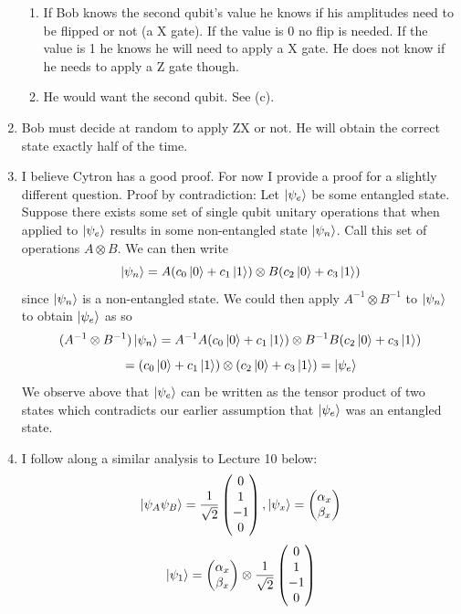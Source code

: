 \documentclass[12pt]{article}
\begin{document}
\begin{enumerate}[font=\bfseries]
\begin{enumerate}
        \item If Bob knows the second qubit's value he knows if his amplitudes need to be flipped or not (a X gate). If the value is 0 no flip is needed. If the value is 1 he knows he will need to apply a X gate. He does not know if he needs to apply a Z gate though.
        \item He would want the second qubit. See (c).
    \end{enumerate}
    \item Bob must decide at random to apply ZX or not. He will obtain the correct state exactly half of the time.
    \item I believe Cytron has a good proof. For now I provide a proof for a slightly different question. Proof by contradiction: Let $\ket{\psi_e}$ be some entangled state. Suppose there exists some set of single qubit unitary operations that when applied to $\ket{\psi_e}$ results in some non-entangled state $\ket{\psi_n}$. Call this set of operations $A \otimes B$. We can then write
    \[\ket{\psi_n} = A(c_0\ket{0}+c_1\ket{1}) \otimes B(c_2\ket{0}+c_3\ket{1})\]
    since $\ket{\psi_n}$ is a non-entangled state. We could then apply $A^{-1} \otimes B^{-1}$ to $\ket{\psi_n}$ to obtain $\ket{\psi_e}$ as so
    \[(A^{-1} \otimes B^{-1})\ket{\psi_n} = A^{-1}A(c_0\ket{0}+c_1\ket{1}) \otimes B^{-1}B(c_2\ket{0}+c_3\ket{1})\]
    \[= (c_0\ket{0}+c_1\ket{1}) \otimes (c_2\ket{0}+c_3\ket{1}) = \ket{\psi_e}\]
    We observe above that $\ket{\psi_e}$ can be written as the tensor product of two states which contradicts our earlier assumption that $\ket{\psi_e}$ was an entangled state.
    \item I follow along a similar analysis to Lecture 10 below:
    \[\ket{\psi_A\psi_B} = 
    \frac{1}{\sqrt{2}}
    \begin{pmatrix}
    0 \\ 1 \\ -1 \\ 0
    \end{pmatrix}
    ,
    \ket{\psi_x} = 
    \begin{pmatrix}
    \alpha_x \\ \beta_x
    \end{pmatrix}
    \]
    \[
    \ket{\psi_1} = \begin{pmatrix}
    \alpha_x \\ \beta_x
    \end{pmatrix}
    \otimes
    \frac{1}{\sqrt{2}}
    \begin{pmatrix}
    0 \\ 1 \\ -1 \\ 0

\end{pmatrix}\]
\end{enumerate}
\end{document}
